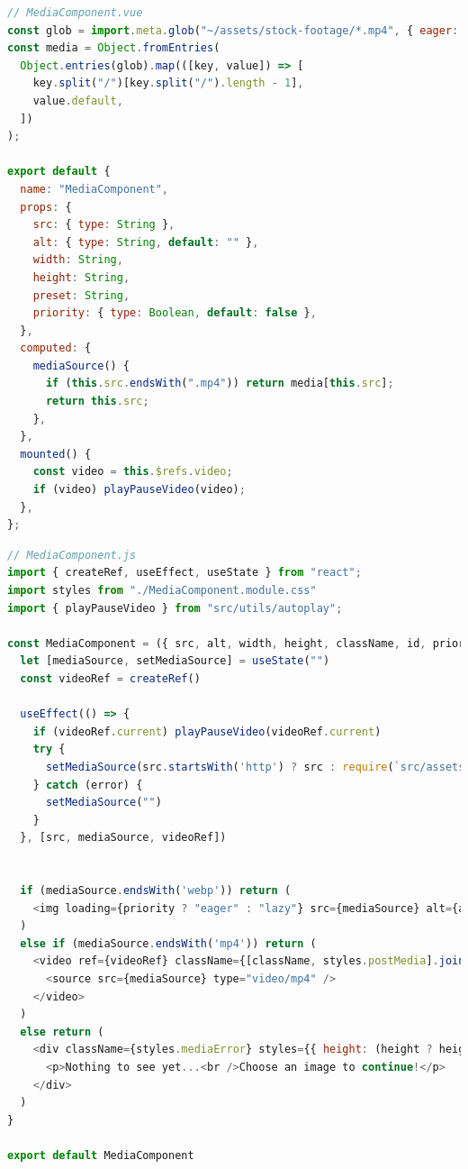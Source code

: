 \documentclass[a4paper, 10pt]{article}
\begin{document}
\begin{lstlisting}[caption=MediaComponent in Nuxt (Script), label={lst:Nuxt:MediaComponent:Script}, language=JavaScript, firstnumber=13]
// MediaComponent.vue
const glob = import.meta.glob("~/assets/stock-footage/*.mp4", { eager: true });
const media = Object.fromEntries(
  Object.entries(glob).map(([key, value]) => [
    key.split("/")[key.split("/").length - 1],
    value.default,
  ])
);

export default {
  name: "MediaComponent",
  props: {
    src: { type: String },
    alt: { type: String, default: "" },
    width: String,
    height: String,
    preset: String,
    priority: { type: Boolean, default: false },
  },
  computed: {
    mediaSource() {
      if (this.src.endsWith(".mp4")) return media[this.src];
      return this.src;
    },
  },
  mounted() {
    const video = this.$refs.video;
    if (video) playPauseVideo(video);
  },
};
\end{lstlisting}

\begin{lstlisting}[caption=MediaComponent in React, label={lst:React:MediaComponent}, language=JavaScript]
// MediaComponent.js
import { createRef, useEffect, useState } from "react";
import styles from "./MediaComponent.module.css"
import { playPauseVideo } from "src/utils/autoplay";

const MediaComponent = ({ src, alt, width, height, className, id, priority = false }) => {
  let [mediaSource, setMediaSource] = useState("")
  const videoRef = createRef()

  useEffect(() => {
    if (videoRef.current) playPauseVideo(videoRef.current)
    try {
      setMediaSource(src.startsWith('http') ? src : require(`src/assets/stock-footage/${src}`))
    } catch (error) {
      setMediaSource("")
    }
  }, [src, mediaSource, videoRef])


  if (mediaSource.endsWith('webp')) return (
    <img loading={priority ? "eager" : "lazy"} src={mediaSource} alt={alt} width={width} height={height} className={[className, styles.postMedia].join(" ")} id={id} />
  )
  else if (mediaSource.endsWith('mp4')) return (
    <video ref={videoRef} className={[className, styles.postMedia].join(" ")} id={id} width={width} preload="metadata" controls controlsList="nodownload,nofullscreen,noremoteplayback" disablePictureInPicture loop muted >
      <source src={mediaSource} type="video/mp4" />
    </video>
  )
  else return (
    <div className={styles.mediaError} styles={{ height: (height ? height + 'px' : '300px'), width: width.endsWith("%") ? width : width + "px" }}>
      <p>Nothing to see yet...<br />Choose an image to continue!</p>
    </div>
  )
}

export default MediaComponent
\end{lstlisting}
\end{document}
